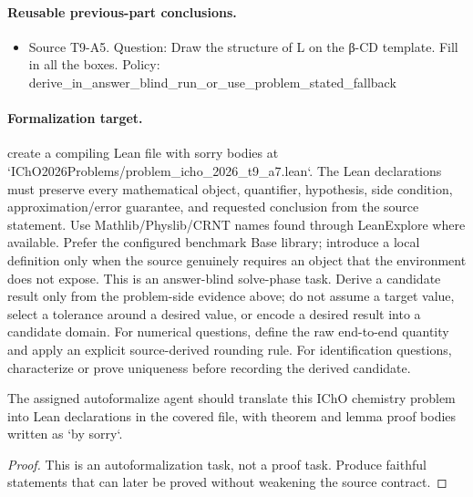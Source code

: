 \paragraph{Reusable previous-part conclusions.}
\begin{itemize}
\item Source T9-A5. Question: Draw the structure of L on the β-CD template. Fill in all the boxes. Policy: derive\_in\_answer\_blind\_run\_or\_use\_problem\_stated\_fallback
\end{itemize}

\paragraph{Formalization target.}
create a compiling Lean file with sorry bodies at `IChO2026Problems/problem\_icho\_2026\_t9\_a7.lean`.
The Lean declarations must preserve every mathematical object, quantifier, hypothesis, side condition, approximation/error guarantee, and requested conclusion from the source statement.
Use Mathlib/Physlib/CRNT names found through LeanExplore where available. Prefer the configured benchmark Base library; introduce a local definition only when the source genuinely requires an object that the environment does not expose.
This is an answer-blind solve-phase task. Derive a candidate result only from the problem-side evidence above; do not assume a target value, select a tolerance around a desired value, or encode a desired result into a candidate domain.
For numerical questions, define the raw end-to-end quantity and apply an explicit source-derived rounding rule. For identification questions, characterize or prove uniqueness before recording the derived candidate.

\begin{theorem}
\label{thm:physics:icho_2026_t9_a7:target}
The assigned autoformalize agent should translate this IChO chemistry problem into Lean declarations in the covered file, with theorem and lemma proof bodies written as `by sorry`.
\end{theorem}
\begin{proof}
This is an autoformalization task, not a proof task. Produce faithful statements that can later be proved without weakening the source contract.
\end{proof}
